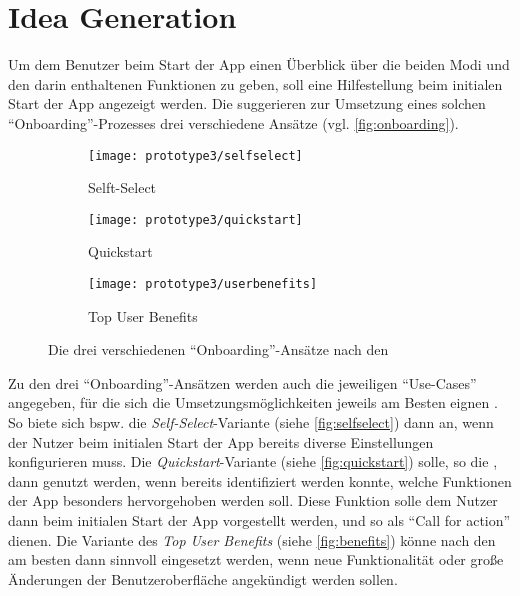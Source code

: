 \section{Idea Generation}\label{sec:idea3}
Um dem Benutzer beim Start der App einen Überblick über die beiden Modi und den darin enthaltenen Funktionen zu geben, soll eine Hilfestellung beim initialen Start der App angezeigt werden.
Die \mg{} suggerieren zur Umsetzung eines solchen ``Onboarding''-Prozesses drei verschiedene Ansätze (vgl. \autoref{fig:onboarding}). \\

\begin{figure}[h]
  \centering
  \begin{subfigure}[t]{0.3\textwidth}
    \texttt{[image: prototype3/selfselect]}
    \caption{Selft-Select}
    \label{fig:selfselect}
  \end{subfigure}
  \begin{subfigure}[t]{0.3\textwidth}
    \texttt{[image: prototype3/quickstart]}
    \caption{Quickstart}
    \label{fig:quickstart}
  \end{subfigure}
  \begin{subfigure}[t]{0.3\textwidth}
    \texttt{[image: prototype3/userbenefits]}
    \caption{Top User Benefits}
    \label{fig:benefits}
  \end{subfigure}
  \caption{Die drei verschiedenen ``Onboarding''-Ansätze nach den \mg{}}
  \label{fig:onboarding}
\end{figure}

Zu den drei ``Onboarding''-Ansätzen werden auch die jeweiligen ``Use-Cases'' angegeben, für die sich die Umsetzungsmöglichkeiten jeweils am Besten eignen \citep[Abschnitt ``Usage'']{Onboarding}.
So biete sich bspw. die \emph{Self-Select}-Variante (siehe \autoref{fig:selfselect}) dann an, wenn der Nutzer beim initialen Start der App bereits diverse Einstellungen konfigurieren muss.
Die \emph{Quickstart}-Variante (siehe \autoref{fig:quickstart}) solle, so die \mg{}, dann genutzt werden, wenn bereits identifiziert werden konnte, welche Funktionen der App besonders hervorgehoben werden soll.
Diese Funktion solle dem Nutzer dann beim initialen Start der App vorgestellt werden, und so als ``Call for action'' dienen.
Die Variante des \emph{Top User Benefits} (siehe \autoref{fig:benefits}) könne nach den \mg{} am besten dann sinnvoll eingesetzt werden, wenn neue Funktionalität oder große Änderungen der Benutzeroberfläche angekündigt werden sollen. \\

